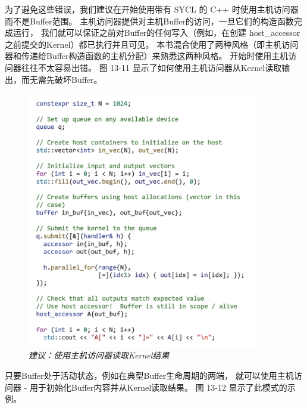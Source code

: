 为了避免这些错误，我们建议在开始使用带有 SYCL 的 C++ 时使用主机访问器而不是Buffer范围。 
主机访问器提供对主机Buffer的访问，一旦它们的构造函数完成运行，
我们就可以保证之前对Buffer的任何写入（例如，在创建 host\_accessor 之前提交的Kernel）都已执行并且可见。 
本书混合使用了两种风格（即主机访问器和传递给Buffer构造函数的主机分配）来熟悉这两种风格。 
开始时使用主机访问器往往不太容易出错。 图 13-11 显示了如何使用主机访问器从Kernel读取输出，而无需先破坏Buffer。

\begin{figure}[H]
	\centering
	\includegraphics[width=0.9\textwidth]{figs/F13.11.png}
	\caption{\textit{建议：使用主机访问器读取Kernel结果 }}
\end{figure}

只要Buffer处于活动状态，例如在典型Buffer生命周期的两端，
就可以使用主机访问器 - 用于初始化Buffer内容并从Kernel读取结果。 图 13-12 显示了此模式的示例。

